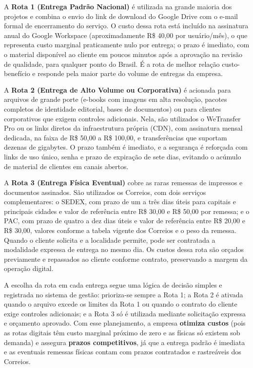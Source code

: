 \documentclass[10pt,a4paper]{article}
\begin{document}
A \textbf{Rota 1 (Entrega Padrão Nacional)} é utilizada na grande maioria dos projetos e combina o envio do link de download do Google Drive com o e-mail formal de encerramento do serviço. O custo dessa rota está incluído na assinatura anual do Google Workspace (aproximadamente R\$ 40,00 por usuário/mês), o que representa custo marginal praticamente nulo por entrega; o prazo é imediato, com o material disponível ao cliente em poucos minutos após a aprovação na revisão de qualidade, para qualquer ponto do Brasil. É a rota de melhor relação custo-benefício e responde pela maior parte do volume de entregas da empresa.

A \textbf{Rota 2 (Entrega de Alto Volume ou Corporativa)} é acionada para arquivos de grande porte (e-books com imagens em alta resolução, pacotes completos de identidade editorial, bases de documentos) ou para clientes corporativos que exigem controles adicionais. Nela, são utilizados o WeTransfer Pro ou os links diretos da infraestrutura própria (CDN), com assinatura mensal dedicada, na faixa de R\$ 50,00 a R\$ 100,00, e transferências que suportam dezenas de gigabytes. O prazo também é imediato, e a segurança é reforçada com links de uso único, senha e prazo de expiração de sete dias, evitando o acúmulo de material de clientes em canais abertos.

A \textbf{Rota 3 (Entrega Física Eventual)} cobre as raras remessas de impressos e documentos assinados. São utilizados os Correios, com dois serviços complementares: o SEDEX, com prazo de um a três dias úteis para capitais e principais cidades e valor de referência entre R\$ 30,00 e R\$ 50,00 por remessa; e o PAC, com prazo de quatro a dez dias úteis e valor de referência entre R\$ 20,00 e R\$ 30,00, valores conforme a tabela vigente dos Correios e o peso da remessa. Quando o cliente solicita e a localidade permite, pode ser contratada a modalidade expressa de entrega no mesmo dia. Os custos dessa rota são orçados previamente e repassados ao cliente conforme contrato, preservando a margem da operação digital.

A escolha da rota em cada entrega segue uma lógica de decisão simples e registrada no sistema de gestão: prioriza-se sempre a Rota 1; a Rota 2 é ativada quando o arquivo excede os limites da Rota 1 ou quando o contrato do cliente exige controles adicionais; e a Rota 3 só é utilizada mediante solicitação expressa e orçamento aprovado. Com esse planejamento, a empresa \textbf{otimiza custos} (pois as rotas digitais têm custo marginal próximo de zero e as físicas só existem sob demanda) e assegura \textbf{prazos competitivos}, já que a entrega padrão é imediata e as eventuais remessas físicas contam com prazos contratados e rastreáveis dos Correios.
\end{document}
